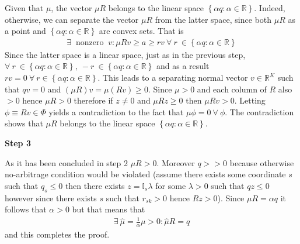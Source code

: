 \documentclass[a4paper]{article}
\begin{document}
Given that $\mu$, the vector $\mu R$ belongs to the linear space $\left\{\alpha q : \alpha \in \mathbb{R}\right\}$. Indeed, otherwise, we can separate the vector $\mu R$ from the latter space, since both $\mu R$ as a point and $\left\{\alpha q : \alpha \in \mathbb{R}\right\}$ are convex sets. That is
\begin{align*}
\exists\ \text{ nonzero }\ v: \mu R v  \ge a \ge rv\ \forall\ r\ \in\left\{\alpha q : \alpha \in \mathbb{R}\right\}
\end{align*}
Since the latter space is a linear
space, just as in the previous step, $\forall\ r\ \in \left\{\alpha q : \alpha \in \mathbb{R}\right\},\ -r\ \in \left\{\alpha q : \alpha \in \mathbb{R}\right\} $ and as a result $rv = 0\ \forall\ r\in\left\{\alpha q : \alpha \in \mathbb{R}\right\}$. This leads to a separating normal vector $v \in \mathbb{R}^K$ such that
$qv = 0$ and $(\mu R)v = \mu (Rv) \ge 0$. Since $\mu >0$ and each column of $R$ also $>0$ hence $\mu R >0$ therefore if $z \neq 0$ and $\mu R z \ge 0$ then $\mu R v > 0$. Letting $\phi \equiv Rv \in \Phi$ yields a contradiction to the fact that $\mu \phi = 0\ \forall\ \phi$. The contradiction shows that $\mu R$ belongs to the linear space $\left\{\alpha q : \alpha \in \mathbb{R}\right\}$.

\textbf{Step 3}

As it has been concluded in step 2 $\mu R >0$. Moreover $q >> 0$ because otherwise no-arbitrage condition would be violated (assume there exists some coordinate $s$ such that $q_s \le 0$ then there exists $z = \mathbb{I}_s \lambda$ for some $\lambda > 0$ such that $qz \le 0$ however since there exists $s$ such that $r_{sk} >0$ hence $Rz > 0$).
Since $\mu R = \alpha q$ it follows that $\alpha >0$ but that means that
\begin{align*}
\exists\ \hat{\mu} = \frac{1}{\alpha}\mu >0: \hat{\mu}R = q
\end{align*}
and this completes the proof.
\end{document}

